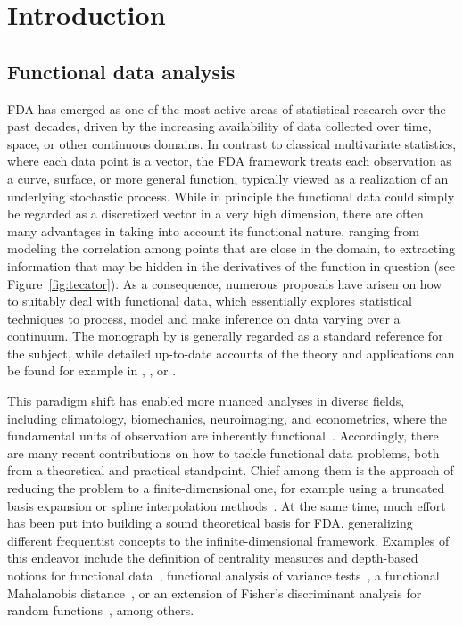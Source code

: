 \chapter{Introduction}\label{ch:introduction}

\section{Functional data analysis}

\acf{FDA} has emerged as one of the most active areas of statistical research over the past decades, driven by the increasing availability of data collected over time, space, or other continuous domains. In contrast to classical multivariate statistics, where each data point is a vector, the \acs{FDA} framework treats each observation as a curve, surface, or more general function, typically viewed as a realization of an underlying stochastic process. While in principle the functional data could simply be regarded as a discretized vector in a very high dimension, there are often many advantages in taking into account its functional nature, ranging from modeling the correlation among points that are close in the domain, to extracting information that may be hidden in the derivatives of the function in question (see Figure~\ref{fig:tecator}). As a consequence, numerous proposals have arisen on how to suitably deal with functional data, which essentially explores statistical techniques to process, model and make inference on data varying over a continuum. The monograph by \citet{ramsay2005functional} is generally regarded as a standard reference for the subject, while detailed up-to-date accounts of the theory and applications can be found for example in \citet{hsing2015theoretical}, \citet{horvath2012inference}, or \citet{wang2016functional}.

This paradigm shift has enabled more nuanced analyses in diverse fields, including climatology, biomechanics, neuroimaging, and econometrics, where the fundamental units of observation are inherently functional~\citep{ullah2013applications}. Accordingly, there are many recent contributions on how to tackle functional data problems, both from a theoretical and practical standpoint. Chief among them is the approach of reducing the problem to a finite-dimensional one, for example using a truncated basis expansion or spline interpolation methods~\citep{muller2005generalized, aguilera2013comparative}. At the same time, much effort has been put into building a sound theoretical basis for \acs{FDA}, generalizing different frequentist concepts to the infinite-dimensional framework. Examples of this endeavor include the definition of centrality measures and depth-based notions for functional data~\citep{lopez2009concept}, functional analysis of variance tests~\citep{cuevas2004anova}, a functional Mahalanobis distance~\citep{galeano2015mahalanobis, berrendero2020mahalanobis}, or an extension of Fisher's discriminant analysis for random functions~\citep{shin2008extension}, among others.

